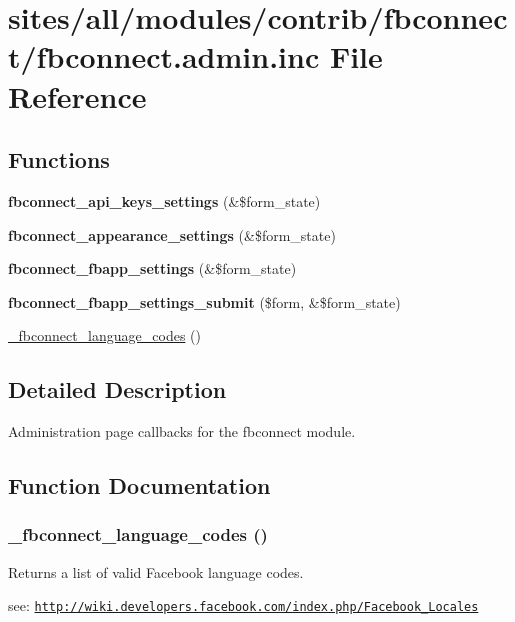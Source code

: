 \hypertarget{fbconnect_8admin_8inc}{
\section{sites/all/modules/contrib/fbconnect/fbconnect.admin.inc File Reference}
\label{fbconnect_8admin_8inc}
}
\subsection*{Functions}
\begin{CompactItemize}
\item 
\hypertarget{fbconnect_8admin_8inc_f7f1beb2e47c7c6fc2ccc67a87765e9f}{
\textbf{fbconnect\_\-api\_\-keys\_\-settings} (\&\$form\_\-state)}
\label{fbconnect_8admin_8inc_f7f1beb2e47c7c6fc2ccc67a87765e9f}

\item 
\hypertarget{fbconnect_8admin_8inc_0e9942a50da825643fd63cc467120ed1}{
\textbf{fbconnect\_\-appearance\_\-settings} (\&\$form\_\-state)}
\label{fbconnect_8admin_8inc_0e9942a50da825643fd63cc467120ed1}

\item 
\hypertarget{fbconnect_8admin_8inc_e236db0b42e2b3f85c3a1b88c9788973}{
\textbf{fbconnect\_\-fbapp\_\-settings} (\&\$form\_\-state)}
\label{fbconnect_8admin_8inc_e236db0b42e2b3f85c3a1b88c9788973}

\item 
\hypertarget{fbconnect_8admin_8inc_c7f7e82b61fb951789ad7bb724d7ef0d}{
\textbf{fbconnect\_\-fbapp\_\-settings\_\-submit} (\$form, \&\$form\_\-state)}
\label{fbconnect_8admin_8inc_c7f7e82b61fb951789ad7bb724d7ef0d}

\item 
\hyperlink{fbconnect_8admin_8inc_49e4e06eebbc1f592da285b5134cd471}{\_\-fbconnect\_\-language\_\-codes} ()
\end{CompactItemize}


\subsection{Detailed Description}
Administration page callbacks for the fbconnect module. 

\subsection{Function Documentation}
\hypertarget{fbconnect_8admin_8inc_49e4e06eebbc1f592da285b5134cd471}{
\subsubsection[{\_\-fbconnect\_\-language\_\-codes}]{\setlength{\rightskip}{0pt plus 5cm}\_\-fbconnect\_\-language\_\-codes ()}}
\label{fbconnect_8admin_8inc_49e4e06eebbc1f592da285b5134cd471}


Returns a list of valid Facebook language codes.

see: \href{http://wiki.developers.facebook.com/index.php/Facebook_Locales}{\tt http://wiki.developers.facebook.com/index.php/Facebook\_\-Locales} 